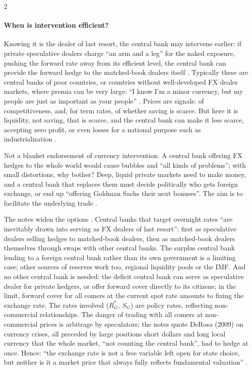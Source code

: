 \begin{paracol}{2}
\paragraph{When is intervention efficient?} Knowing it is the dealer of last resort, the central bank may intervene earlier: if private speculative dealers charge
``an arm and a leg'' for the naked exposure, pushing the forward rate away from its efficient level, the central bank can provide the forward hedge to the
matched-book dealers itself . Typically these are central banks of poor countries, or countries without
well-developed FX dealer markets, where premia can be very large: ``I know I'm a minor currency, but my people are just as important as your people''
. Prices are signals: of competitiveness, and, for term rates, of whether saving is scarce. But here it is liquidity, not
saving, that is scarce, and the central bank can make it less scarce, accepting zero profit, or even losses for a national purpose such as industrialization
.

\begin{coursenote}
Not a blanket endorsement of currency intervention. A central bank offering FX hedges to the whole world would cause bubbles and ``all kinds of problems'';
with small distortions, why bother? Deep, liquid private markets need to make money, and a central bank that replaces them must decide politically who gets
foreign exchange, or end up ``offering Goldman Sachs their next bonuses''. The aim is to facilitate the underlying trade .

The notes widen the options . Central banks that target overnight rates ``are inevitably drawn into serving as FX dealers of last resort'': first as speculative dealers selling
hedges to matched-book dealers, then as matched-book dealers themselves through swaps with other central banks. The surplus central bank lending to a foreign central bank rather than its own
government is a limiting case; other sources of reserves work too, regional liquidity pools or the IMF. And no other central bank is needed: the deficit central bank can serve as speculative dealer
for private hedgers, or offer forward cover directly to its citizens; in the limit, forward cover for all comers at the current spot rate amounts to fixing the exchange rate. The rates involved
($R^\ast_G$, $S_G$) are policy rates, reflecting non-commercial relationships. The danger of trading with all comers at non-commercial prices is arbitrage by speculators; the notes quote DeRosa
(2009) on currency crises, all preceded by large positions short dollars and long local currency that the whole market, ``not counting the central bank'', had to hedge at once. Hence: ``the
exchange rate is not a free variable left open for state choice, but neither is it a market price that always fully reflects fundamental valuation'' .
\end{coursenote}


\end{paracol}
